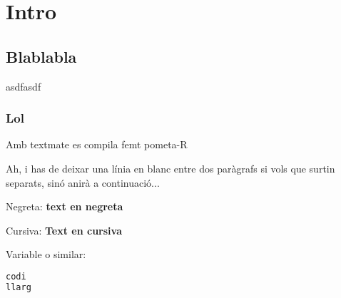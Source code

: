 
\section{Intro}

\subsection{Blablabla}
asdfasdf

\subsubsection{Lol}

Amb textmate es compila femt pometa-R

Ah, i has de deixar una línia en blanc entre dos paràgrafs si vols que surtin separats, sinó anirà a continuació...

Negreta: \textbf{text en negreta}

Cursiva: \textbf{Text en cursiva}

Variable o similar: 

\begin{lstlisting}[label=compi, caption=Comanda de compilació, language=Java]
codi
llarg
\end{lstlisting}

